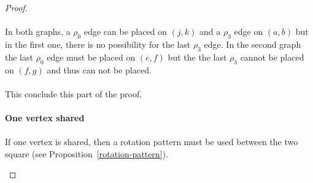 \begin{proof}
\begin{figure}[H]
\begin{center}
\begin{tikzpicture}[scale=.8]
      \end{tikzpicture}
      \caption{}
    \end{center}
  \end{figure}

  \paragraph{}
  In both graphs, a $\rho_0$ edge can be placed on $(j,k)$ and a $\rho_3$ edge on $(a,b)$ but in the first one, there is no possibility for the last $\rho_3$ edge. In the second graph the last $\rho_0$ edge must be placed on $(e,f)$ but the the last $\rho_3$ cannot be placed on $(f,g)$ and thus can not be placed.

  \paragraph{}
  This conclude this part of the proof.

  \paragraph{}
  \textbf{One vertex shared}

  \paragraph{}
  If one vertex is shared, then a rotation pattern must be used between the two square (see Proposition~\ref{rotation-pattern}).

  \begin{figure}[H]
    \begin{center}
\end{center}
\end{figure}
\end{proof}
